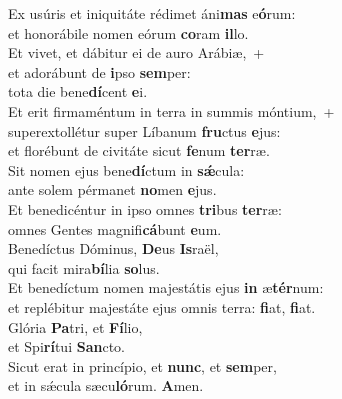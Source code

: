 \evenverse Ex usúris et iniquitáte rédimet áni\textbf{mas} e\textbf{ó}rum:~\*\\
\evenverse et honorábile nomen eórum \textbf{co}ram \textbf{il}lo.\\
\oddverse Et vivet, et dábitur ei de auro Arábiæ,~+\\
\oddverse  et adorábunt de \textbf{i}pso \textbf{sem}per:~\*\\
\oddverse tota die bene\textbf{dí}cent \textbf{e}i.\\
\evenverse Et erit firmaméntum in terra in summis móntium,~+\\
\evenverse  superextollétur super Líbanum \textbf{fru}ctus \textbf{e}jus:~\*\\
\evenverse et florébunt de civitáte sicut \textbf{fe}num \textbf{ter}ræ.\\
\oddverse Sit nomen ejus bene\textbf{dí}ctum in \textbf{sǽ}cula:~\*\\
\oddverse ante solem pérmanet \textbf{no}men \textbf{e}jus.\\
\evenverse Et benedicéntur in ipso omnes \textbf{tri}bus \textbf{ter}ræ:~\*\\
\evenverse omnes Gentes magnifi\textbf{cá}bunt \textbf{e}um.\\
\oddverse Benedíctus Dóminus, \textbf{De}us \textbf{Is}raël,~\*\\
\oddverse qui facit mira\textbf{bí}lia \textbf{so}lus.\\
\evenverse Et benedíctum nomen majestátis ejus \textbf{in} æ\textbf{tér}num:~\*\\
\evenverse et replébitur majestáte ejus omnis terra: \textbf{fi}at, \textbf{fi}at.\\
\oddverse Glória \textbf{Pa}tri, et \textbf{Fí}lio,~\*\\
\oddverse et Spi\textbf{rí}tui \textbf{San}cto.\\
\evenverse Sicut erat in princípio, et \textbf{nunc}, et \textbf{sem}per,~\*\\
\evenverse et in sǽcula sæcu\textbf{ló}rum. \textbf{A}men.\\
